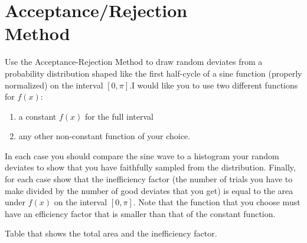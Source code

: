 \section{Acceptance/Rejection \\Method}

Use the Acceptance-Rejection Method to
draw random deviates from a probability distribution shaped like the first half-cycle of a sine
function (properly normalized) on the interval $[0,\pi]$.I would like you to use two different
functions for $f(x)$:
\begin{enumerate}
    \item a constant $f(x)$ for the full interval
    \item any other non-constant function of your choice.
\end{enumerate}

In each case you should compare the sine wave to a histogram your random deviates to show
that you have faithfully sampled from the distribution. Finally, for each case show that the
inefficiency factor (the number of trials you have to make divided by the number of good deviates
that you get) is equal to the area under $f(x)$ on the interval $[0,\pi]$. Note that the function that
you choose must have an efficiency factor that is smaller than that of the constant function.


\begin{table}
    \centering
    
    \caption{Table that shows the total area and the inefficiency factor.}
    \label{tab:accRej}
\end{table}

